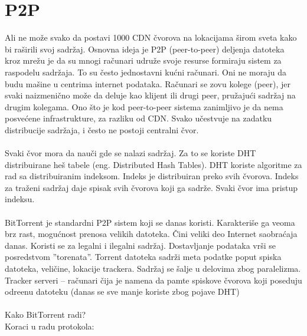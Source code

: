 \documentclass{article} %
\begin{document}
%
%

\section{P2P}

Ali ne mo\v ze svako da postavi 1000 CDN \v cvorova na lokacijama \v sirom sveta kako bi ra\v sirili svoj sadr\v zaj.
Osnovna ideja je P2P (peer-to-peer) deljenja datoteka kroz mre\v zu je da su mnogi ra\v cunari udru\v ze svoje resurse formiraju sistem za raspodelu sadr\v zaja. To su \v cesto jednostavni ku\' cni ra\v cunari. Oni ne moraju da budu ma\v sine u centrima internet podataka. Ra\v cunari se zovu kolege (peer), jer svaki naizmeni\v cno mo\v ze da deluje kao klijent ili drugi peer, pru\v zaju\' ci sadr\v zaj na drugim kolegama. Ono \v sto je kod peer-to-peer sistema zanimljivo je da nema posve\' cene infrastrukture, za razliku od CDN.
Svako u\v cestvuje na zadatku distribucije sadr\v zaja, i \v cesto ne postoji centralni \v cvor.
\\
\\ Svaki \v cvor mora da nau\v ci gde se nalazi sadr\v zaj. Za to se koriste DHT distribuirane he\v s tabele (eng. Distributed Hash Tables). DHT  koriste algoritme za rad sa distribuiranim indeksom. Indeks je distribuiran preko svih \v cvorova. Indeks za tra\v zeni sadr\v zaj daje spisak svih \v cvorova koji ga sadr\v ze. Svaki \v cvor ima pristup indeksu.
\\
\\ BitTorrent je standardni P2P sistem koji se danas koristi. Karakteri\v se ga veoma brz rast, mogu\' cnost prenosa velikih datoteka. \v Cini veliki deo Internet saobra\' caja danas. Koristi se za legalni i ilegalni sadr\v zaj. Dostavljanje podataka vr\v si se posredstvom ''torenata''. Torrent datoteka sadr\v zi meta podatke poput spiska datoteka, veli\v cine, lokacije trackera. Sadr\v zaj se \v salje u delovima zbog paralelizma. Tracker serveri – ra\v cunari \v cija je namena da pamte spiskove  \v cvorova koji poseduju odre\dj enu datoteku (danas se sve manje koriste zbog pojave DHT)
\\
\\ Kako BitTorrent radi?
\\
Koraci u radu protokola:
\end{document}
